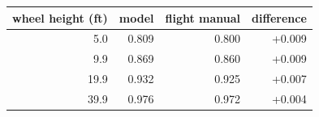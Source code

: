 \begin{tabular}{@{}rrrr@{}}
\toprule
wheel height (ft) & model & flight manual & difference \\
\midrule
5.0 & 0.809 & 0.800 & +0.009 \\
9.9 & 0.869 & 0.860 & +0.009 \\
19.9 & 0.932 & 0.925 & +0.007 \\
39.9 & 0.976 & 0.972 & +0.004 \\
\bottomrule
\end{tabular}
